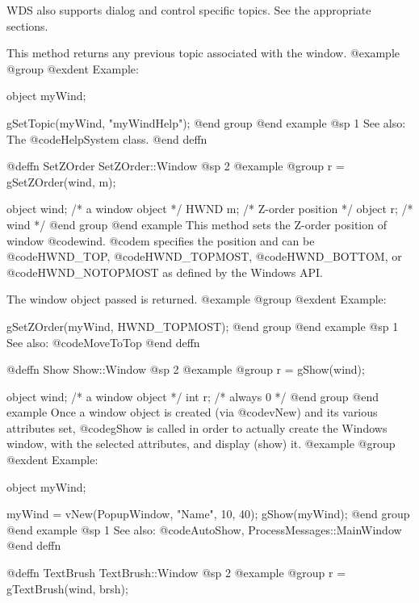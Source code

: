 WDS also supports dialog and control specific topics.  See the appropriate
sections.

This method returns any previous topic associated with the window.
@example
@group
@exdent Example:

object  myWind;

gSetTopic(myWind, "myWindHelp");
@end group
@end example
@sp 1
See also:  The @code{HelpSystem} class.
@end deffn













@deffn {SetZOrder} SetZOrder::Window
@sp 2
@example
@group
r = gSetZOrder(wind, m);

object  wind;   /*  a window object     */
HWND    m;      /*  Z-order position    */
object  r;      /*  wind                */
@end group
@end example
This method sets the Z-order position of window @code{wind}.
@code{m} specifies the position and can be @code{HWND_TOP},
@code{HWND_TOPMOST}, @code{HWND_BOTTOM}, or @code{HWND_NOTOPMOST}
as defined by the Windows API.

The window object passed is returned.
@example
@group
@exdent Example:

gSetZOrder(myWind, HWND_TOPMOST);
@end group
@end example
@sp 1
See also:  @code{MoveToTop}
@end deffn




@deffn {Show} Show::Window
@sp 2
@example
@group
r = gShow(wind);

object  wind;   /*  a window object     */
int     r;      /*  always 0            */
@end group
@end example
Once a window object is created (via @code{vNew}) and its various attributes
set, @code{gShow} is called in order to actually create the Windows window,
with the selected attributes, and display (show) it.
@example
@group
@exdent Example:

object  myWind;

myWind = vNew(PopupWindow, "Name", 10, 40);
gShow(myWind);
@end group
@end example
@sp 1
See also:  @code{AutoShow, ProcessMessages::MainWindow}
@end deffn









@deffn {TextBrush} TextBrush::Window
@sp 2
@example
@group
r = gTextBrush(wind, brsh);

